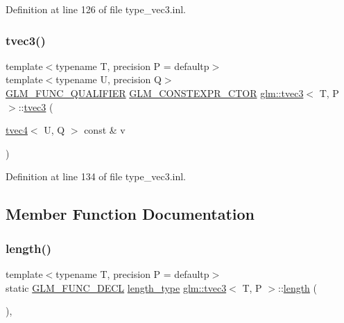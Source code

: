 Definition at line 126 of file type\+\_\+vec3.\+inl.

\mbox{\label{structglm_1_1tvec3_a2c796e51503a52b4ad1d3c1efd9e9a8e}} 
\subsubsection{\texorpdfstring{tvec3()}{tvec3()}\hspace{0.1cm}{\footnotesize\ttfamily [23/23]}}
{\footnotesize\ttfamily template$<$typename T, precision P = defaultp$>$ \\
template$<$typename U, precision Q$>$ \\
\mbox{\hyperlink{setup_8hpp_a33fdea6f91c5f834105f7415e2a64407}{G\+L\+M\+\_\+\+F\+U\+N\+C\+\_\+\+Q\+U\+A\+L\+I\+F\+I\+ER}} \mbox{\hyperlink{setup_8hpp_ad34178a09666081abdb573c14d1f4a5a}{G\+L\+M\+\_\+\+C\+O\+N\+S\+T\+E\+X\+P\+R\+\_\+\+C\+T\+OR}} \mbox{\hyperlink{structglm_1_1tvec3}{glm\+::tvec3}}$<$ T, P $>$\+::\mbox{\hyperlink{structglm_1_1tvec3}{tvec3}} (\begin{DoxyParamCaption}\item[{\mbox{\hyperlink{structglm_1_1tvec4}{tvec4}}$<$ U, Q $>$ const \&}]{v }\end{DoxyParamCaption})}



Definition at line 134 of file type\+\_\+vec3.\+inl.



\subsection{Member Function Documentation}
\mbox{\label{structglm_1_1tvec3_a484e455bf464a07e7679790637aaf1a7}} 
\subsubsection{\texorpdfstring{length()}{length()}}
{\footnotesize\ttfamily template$<$typename T, precision P = defaultp$>$ \\
static \mbox{\hyperlink{setup_8hpp_ab2d052de21a70539923e9bcbf6e83a51}{G\+L\+M\+\_\+\+F\+U\+N\+C\+\_\+\+D\+E\+CL}} \mbox{\hyperlink{structglm_1_1tvec3_a3a79c6a1cfc9fb8821a0a878fa2de91a}{length\+\_\+type}} \mbox{\hyperlink{structglm_1_1tvec3}{glm\+::tvec3}}$<$ T, P $>$\+::\mbox{\hyperlink{glad_8h_a1499969c13207ed8ab6f796685d4933f}{length}} (\begin{DoxyParamCaption}{ }\end{DoxyParamCaption})\hspace{0.3cm}{\ttfamily [inline]}, {\ttfamily [static]}}



